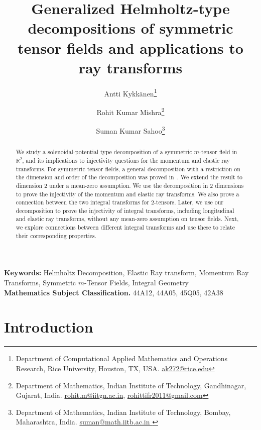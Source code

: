 \documentclass[11pt]{article}
\author{Antti Kykk\"anen\thanks{Department of Computational Applied Mathematics and Operations Research, Rice University, Houston, TX, USA. \url{ak272@rice.edu}}\and Rohit Kumar Mishra\thanks{Department of Mathematics, Indian Institute of Technology, Gandhinagar, Gujarat, India. \url{rohit.m@iitgn.ac.in}, \url{rohittifr2011@gmail.com}}
\and Suman Kumar Sahoo\thanks{Department of Mathematics, Indian Institute of Technology, Bombay, Maharashtra, India. \url{suman@math.iitb.ac.in }}}
\title{Generalized Helmholtz-type decompositions of symmetric tensor fields and applications to ray transforms}
\newcommand{\Rb}{\mathbb{R}}
\begin{document}
\maketitle
\begin{abstract}
We study a solenoidal-potential type decomposition of a symmetric $m$-tensor field in $\Rb^2$, and its implications to injectivity questions for the momentum and elastic ray transforms. For symmetric tensor fields, a general decomposition with a restriction on the dimension and order of the decomposition was proved in~\cite{Rohit_Suman}. We extend the result to dimension $2$ under a mean-zero assumption. We use the decomposition in $2$ dimensions to prove the injectivity of the momentum and elastic ray transforms. We also prove a connection between the two integral transforms for $2$-tensors.
Later, we use our decomposition to prove the injectivity of integral transforms, including longitudinal and elastic ray transforms, without any mean-zero assumption on tensor fields. Next, we explore connections between different integral transforms and use these to relate their corresponding properties. 
\end{abstract}
\vspace{2mm} 
\textbf{Keywords:} Helmholtz Decomposition, Elastic Ray transform, Momentum Ray Transforms, Symmetric $m$-Tensor Fields, Integral Geometry
\vspace{2mm} \\
\textbf{Mathematics Subject Classification.} 44A12, 44A05, 45Q05, 42A38

\section{Introduction}
\end{document}
